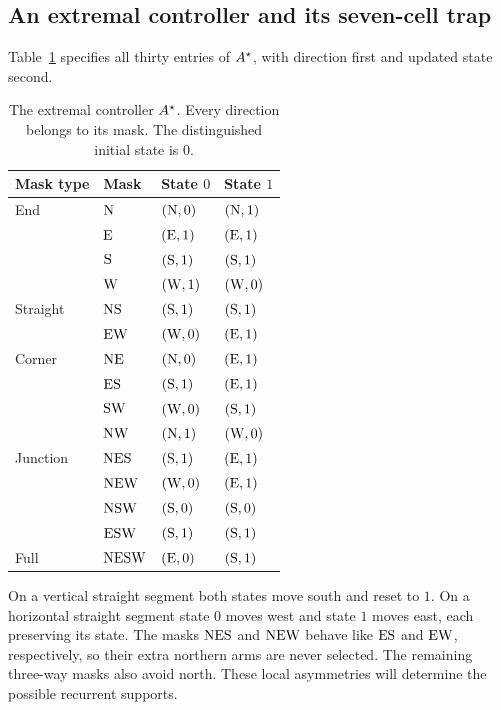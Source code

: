 \subsection{An extremal controller and its seven-cell trap}\label{sec:extremal}

Table~\ref{tab:astar} specifies all thirty entries of $A^{\star}$, with direction first and updated state second.

\begin{table}[!htbp]
\centering
\begin{tabular}{@{}llll@{}}
\toprule
Mask type & Mask & State $0$ & State $1$\\
\midrule
End & $\mathrm{N}$ & $(\mathrm{N},0)$ & $(\mathrm{N},1)$\\
 & $\mathrm{E}$ & $(\mathrm{E},1)$ & $(\mathrm{E},1)$\\
 & $\mathrm{S}$ & $(\mathrm{S},1)$ & $(\mathrm{S},1)$\\
 & $\mathrm{W}$ & $(\mathrm{W},1)$ & $(\mathrm{W},0)$\\
Straight & $\mathrm{N}\mathrm{S}$ & $(\mathrm{S},1)$ & $(\mathrm{S},1)$\\
 & $\mathrm{E}\mathrm{W}$ & $(\mathrm{W},0)$ & $(\mathrm{E},1)$\\
Corner & $\mathrm{N}\mathrm{E}$ & $(\mathrm{N},0)$ & $(\mathrm{E},1)$\\
 & $\mathrm{E}\mathrm{S}$ & $(\mathrm{S},1)$ & $(\mathrm{E},1)$\\
 & $\mathrm{S}\mathrm{W}$ & $(\mathrm{W},0)$ & $(\mathrm{S},1)$\\
 & $\mathrm{N}\mathrm{W}$ & $(\mathrm{N},1)$ & $(\mathrm{W},0)$\\
Junction & $\mathrm{N}\mathrm{E}\mathrm{S}$ & $(\mathrm{S},1)$ & $(\mathrm{E},1)$\\
 & $\mathrm{N}\mathrm{E}\mathrm{W}$ & $(\mathrm{W},0)$ & $(\mathrm{E},1)$\\
 & $\mathrm{N}\mathrm{S}\mathrm{W}$ & $(\mathrm{S},0)$ & $(\mathrm{S},0)$\\
 & $\mathrm{E}\mathrm{S}\mathrm{W}$ & $(\mathrm{S},1)$ & $(\mathrm{S},1)$\\
Full & $\mathrm{N}\mathrm{E}\mathrm{S}\mathrm{W}$ & $(\mathrm{E},0)$ & $(\mathrm{S},1)$\\
\bottomrule
\end{tabular}
\caption{The extremal controller $A^{\star}$. Every direction belongs to its mask. The distinguished initial state is $0$.}
\label{tab:astar}
\end{table}

On a vertical straight segment both states move south and reset to $1$. On a horizontal straight segment state $0$ moves west and state $1$ moves east, each preserving its state. The masks $\mathrm{N}\mathrm{E}\mathrm{S}$ and $\mathrm{N}\mathrm{E}\mathrm{W}$ behave like $\mathrm{E}\mathrm{S}$ and $\mathrm{E}\mathrm{W}$, respectively, so their extra northern arms are never selected. The remaining three-way masks also avoid north. These local asymmetries will determine the possible recurrent supports.

